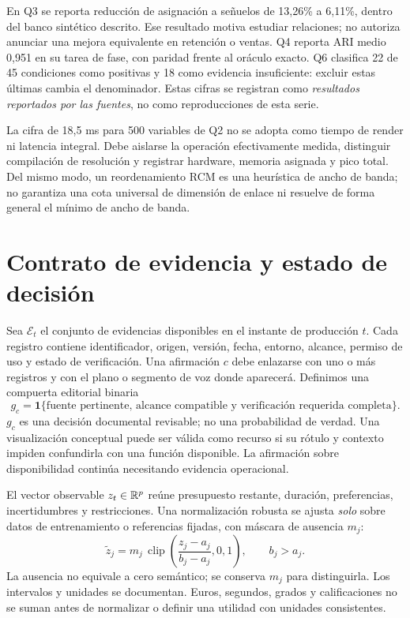 En Q3 se reporta reducción de asignación a señuelos de 13,26\% a 6,11\%, dentro del banco sintético descrito. Ese resultado motiva estudiar relaciones; no autoriza anunciar una mejora equivalente en retención o ventas. Q4 reporta ARI medio 0,951 en su tarea de fase, con paridad frente al oráculo exacto. Q6 clasifica 22 de 45 condiciones como positivas y 18 como evidencia insuficiente: excluir estas últimas cambia el denominador. Estas cifras se registran como \emph{resultados reportados por las fuentes}, no como reproducciones de esta serie.

La cifra de 18,5 ms para 500 variables de Q2 no se adopta como tiempo de render ni latencia integral. Debe aislarse la operación efectivamente medida, distinguir compilación de resolución y registrar hardware, memoria asignada y pico total. Del mismo modo, un reordenamiento RCM es una heurística de ancho de banda; no garantiza una cota universal de dimensión de enlace ni resuelve de forma general el mínimo de ancho de banda.

\section{Contrato de evidencia y estado de decisión}
Sea $\mathcal E_t$ el conjunto de evidencias disponibles en el instante de producción $t$. Cada registro contiene identificador, origen, versión, fecha, entorno, alcance, permiso de uso y estado de verificación. Una afirmación $c$ debe enlazarse con uno o más registros y con el plano o segmento de voz donde aparecerá. Definimos una compuerta editorial binaria
\begin{equation}
 g_c=\mathbf 1\{\text{fuente pertinente, alcance compatible y verificación requerida completa}\}.
\end{equation}
$g_c$ es una decisión documental revisable; no una probabilidad de verdad. Una visualización conceptual puede ser válida como recurso si su rótulo y contexto impiden confundirla con una función disponible. La afirmación sobre disponibilidad continúa necesitando evidencia operacional.

El vector observable $z_t\in\mathbb{R}^p$ reúne presupuesto restante, duración, preferencias, incertidumbres y restricciones. Una normalización robusta se ajusta \emph{solo} sobre datos de entrenamiento o referencias fijadas, con máscara de ausencia $m_j$:
\begin{equation}
 \widetilde z_j=m_j\,\operatorname{clip}\!\left(\frac{z_j-a_j}{b_j-a_j},0,1\right),\qquad b_j>a_j.
\end{equation}
La ausencia no equivale a cero semántico; se conserva $m_j$ para distinguirla. Los intervalos y unidades se documentan. Euros, segundos, grados y calificaciones no se suman antes de normalizar o definir una utilidad con unidades consistentes.

